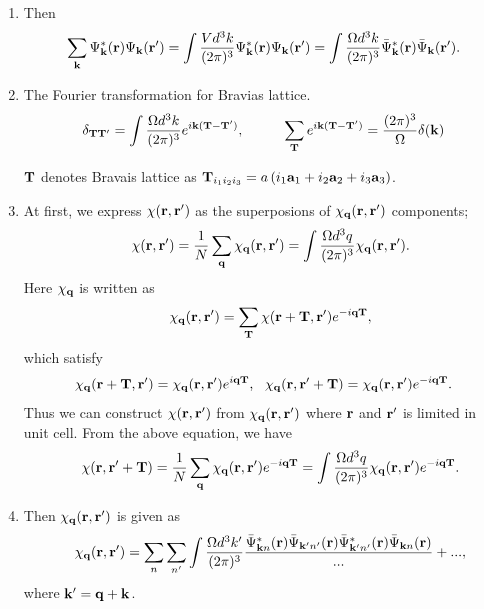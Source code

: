 \documentclass[a4paper,10pt,epsf,fleqn]{article}
\newcommand{\bfq}{{\bf q}}
\newcommand{\bfk}{{\bf k}}
\newcommand{\bfr}{{\bf r}}
\newcommand{\bfa}{{\bf a}}
\newcommand{\bfT}{{\bf T}}
\begin{document}
\begin{enumerate}
\item
Then
\begin{eqnarray}
 \sum_{\bfk} \Psi^*_{\bfk}(\bfr) {\Psi}_{\bfk} (\bfr')
= \int \frac{V d^3 k  }{(2 \pi)^3}
\Psi^*_{\bfk}(\bfr) {\Psi}_{\bfk} (\bfr')
= \int \frac{\Omega d^3 k }{(2 \pi)^3}
\bar{\Psi}^*_{\bfk}(\bfr) \bar{\Psi}_{\bfk} (\bfr').
\end{eqnarray}

\item
The Fourier transformation for Bravias lattice.
\begin{eqnarray}
\delta_{\bfT \bfT'} = 
\int \frac{\Omega d^3 k}{(2 \pi)^3} e^{i \bfk (\bfT-\bfT')}, \hspace{1cm}
\sum_\bfT e^{i \bfk (\bfT -\bfT')} = \frac{(2 \pi)^3}{\Omega} \delta(\bfk)
\end{eqnarray}

$\bfT$ denotes Bravais lattice as 
$\bfT_{i_1 i_2 i_3} = a \left(i_1 \bfa_1 +i_2 \bfa_2 + i_3 \bfa_3 \right)$.

\item
At first, we express $\chi(\bfr,\bfr')$ as the superposions of $\chi_\bfq(\bfr, \bfr')$ components;
\begin{eqnarray}
&&\chi(\bfr, \bfr') = \frac{1}{N} \sum_\bfq \chi_\bfq(\bfr, \bfr')
= \int \frac{\Omega d^3 q }{(2 \pi)^3} \chi_\bfq(\bfr, \bfr').
\end{eqnarray}
Here $\chi_\bfq$ is written as
\begin{eqnarray}
&&\chi_\bfq(\bfr, \bfr') = \sum_\bfT \chi(\bfr+\bfT, \bfr') e^{-i \bfq \bfT},
\end{eqnarray}
which satisfy 
\begin{eqnarray}
\chi_\bfq(\bfr+\bfT, \bfr') = \chi_\bfq(\bfr, \bfr')  e^{i \bfq \bfT}, \ \ 
\chi_\bfq(\bfr, \bfr'+\bfT) = \chi_\bfq(\bfr, \bfr')  e^{-i \bfq \bfT}.
\end{eqnarray}
Thus we can construct $\chi(\bfr, \bfr')$
from $\chi_\bfq(\bfr, \bfr')$ where $\bfr$ and $\bfr'$ is limited in unit cell.
From the above equation, we have
\begin{eqnarray}
&&\chi(\bfr,\bfr'+\bfT)=  \frac{1}{N} \sum_\bfq \chi_\bfq(\bfr, \bfr') e^{-i \bfq \bfT}
= \int \frac{\Omega d^3 q}{(2 \pi)^3} \chi_{\bfq} (\bfr, \bfr') e^{-i \bfq \bfT}.
\end{eqnarray}

\item Then $\chi_\bfq (\bfr, \bfr')$ is given as
\begin{eqnarray}
&&\chi_\bfq (\bfr, \bfr')
= \sum_{n} \sum_{n'} \int \frac{\Omega d^3 k'}{(2 \pi)^3} 
\frac{\bar{\Psi}^*_{\bfk  n }(\bfr)      \bar{\Psi}_{\bfk' n'}(\bfr) 
\bar{\Psi}^*_{\bfk' n'}(\bfr) \bar{\Psi}_{\bfk n  }(\bfr)}{...} + ...,
\end{eqnarray}
where $\bfk' = \bfq+\bfk$. 


\end{enumerate}
\end{document}
